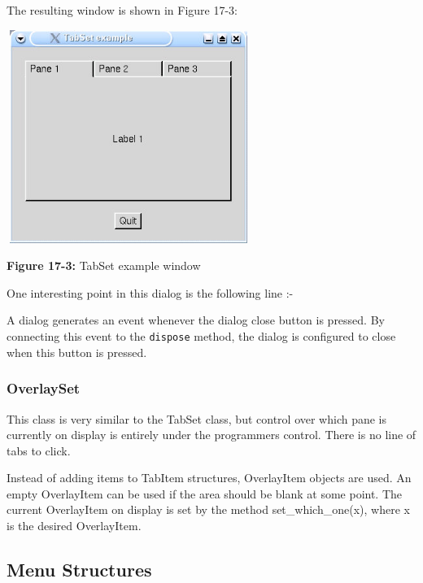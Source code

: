 \bigskip

The resulting window is shown in Figure 17-3:

\begin{center}
\includegraphics[width=3.1272in,height=2.7299in]{ub-img/ub-img52.jpg}
\end{center}

{\sffamily\bfseries Figure 17-3:}
{\sffamily TabSet example window}

\bigskip

One interesting point in this dialog is the following line :-



A dialog generates an event whenever the dialog close button is
pressed. By connecting this event to the \texttt{dispose}
method, the dialog is configured to close when this button is
pressed.

\subsubsection[OverlaySet]{OverlaySet}

This class is very similar to the
\textsf{TabSet} class, but control over which pane is currently on
display is entirely under the programmer{\textquotesingle}s control.
There is no line of tabs to click.

Instead of adding items to \textsf{TabItem} structures,
\textsf{OverlayItem} objects are used. An empty \textsf{OverlayItem}
can be used if the area should be blank at some point. The current
\textsf{OverlayItem} on display is set by the method
\textsf{set\_which\_one(x)}, where \textsf{x} is the desired
\textsf{OverlayItem}.

\subsection{Menu Structures}

